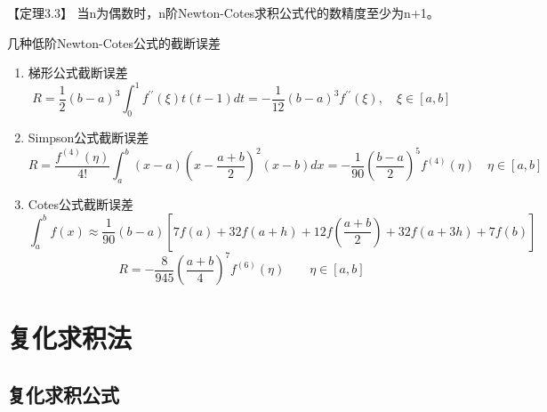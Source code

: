 \documentclass[12pt]{report}
\begin{document}
【定理3.3】 \quad 当n为偶数时，n阶Newton-Cotes求积公式代的数精度至少为n+1。

几种低阶Newton-Cotes公式的截断误差

\begin{enumerate}
	\item 梯形公式截断误差
	\[
	R = \frac{1}{2}(b - a)^3 \int_{0}^{1} f^{\prime \prime} (\xi) t(t-1) dt = -\frac{1}{12} (b - a)^3 f^{\prime \prime} (\xi) , \quad \xi \in [a, b]
	\]
	\item Simpson公式截断误差
	\[
	R = \frac{f^{(4)}(\eta)}{4!} \int_{a}^{b} (x - a)\left(x - \frac{a+b}{2}\right)^2 (x - b) dx = -\frac{1}{90} \left(\frac{b-a}{2}\right)^5 f^{(4)}(\eta) \quad \eta \in [a, b]
	\]
	\item Cotes公式截断误差
	\[
	\int_{a}^{b} f(x) \approx \frac{1}{90} (b - a)\left[7f(a) + 32f(a+h) + 12f\left(\frac{a+b}{2}\right) + 32f(a+3h) + 7f(b)\right]
	\]
	\[
	R = -\frac{8}{945}\left(\frac{a+b}{4}\right)^7 f^{(6)}(\eta) \quad \quad \eta \in [a, b]
	\]
\end{enumerate}


\section{复化求积法}

\subsection{复化求积公式}
\end{document}
